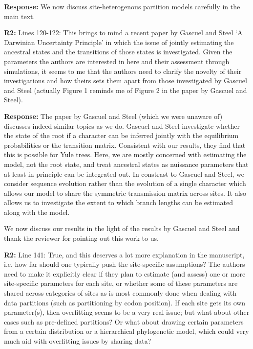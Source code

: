\documentclass[aps,rmp,onecolumn]{revtex4-1}
\newcommand{\refb}[1]{\textbf{R2:} #1}
\newcommand{\response}[1]{{\color{black}\textbf{Response:} #1}}
\begin{document}
\response{We now discuss site-heterogenous partition models carefully in the main text.}


\refb{Lines 120-122: This brings to mind a recent paper by Gascuel and Steel ‘A Darwinian Uncertainty Principle’ in which the issue of jointly estimating the ancestral states and the transitions of those states is investigated. Given the parameters the authors are interested in here and their assessment through simulations, it seems to me that the authors need to clarify the novelty of their investigations and how theirs sets them apart from those investigated by Gascuel and Steel (actually Figure 1 reminds me of Figure 2 in the paper by Gascuel and Steel).}

\response{The paper by Gascuel and Steel (which we were unaware of) discusses indeed similar topics as we do. Gascuel and Steel investigate whether the state of the root if a character can be inferred jointly with the equilibrium probabilities or the transition matrix. Consistent with our results, they find that this is possible for Yule trees.
Here, we are mostly concerned with estimating the model, not the root state, and treat ancestral states as nuissance parameters that at least in principle can be integrated out.
In constrast to Gascuel and Steel, we consider sequence evolution rather than the evolution of a single character which allows our model to share the symmetric transmission matrix across sites.
It also allows us to investigate the extent to which branch lengths can be estimated along with the model.

We now discuss our results in the light of the results by Gascuel and Steel and thank the reviewer for pointing out this work to us.
}

\refb{Line 141: True, and this deserves a lot more explanation in the manuscript, i.e. how far should one typically push the site-specific assumptions? The authors need to make it explicitly clear if they plan to estimate (and assess) one or more site-specific parameters for each site, or whether some of these parameters are shared across categories of sites as is most commonly done when dealing with data partitions (such as partitioning by codon position). If each site gets its own parameter(s), then overfitting seems to be a very real issue; but what about other cases such as pre-defined partitions? Or what about drawing certain parameters from a certain distribution or a hierarchical phylogenetic model, which could very much aid with overfitting issues by sharing data?}
\end{document}
